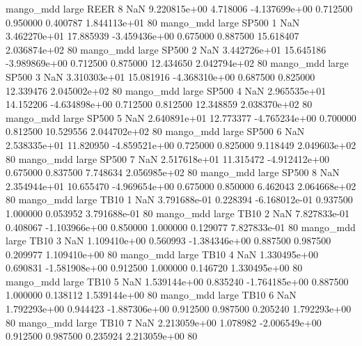         mango_mdd      large     REER                 8                  NaN 9.220815e+00      4.718006 -4.137699e+00 0.712500 0.950000       0.400787 1.844113e+01 80
        mango_mdd      large    SP500                 1                  NaN 3.462270e+01     17.885939 -3.459436e+00 0.675000 0.887500      15.618407 2.036874e+02 80
        mango_mdd      large    SP500                 2                  NaN 3.442726e+01     15.645186 -3.989869e+00 0.712500 0.875000      12.434650 2.042794e+02 80
        mango_mdd      large    SP500                 3                  NaN 3.310303e+01     15.081916 -4.368310e+00 0.687500 0.825000      12.339476 2.045002e+02 80
        mango_mdd      large    SP500                 4                  NaN 2.965535e+01     14.152206 -4.634898e+00 0.712500 0.812500      12.348859 2.038370e+02 80
        mango_mdd      large    SP500                 5                  NaN 2.640891e+01     12.773377 -4.765234e+00 0.700000 0.812500      10.529556 2.044702e+02 80
        mango_mdd      large    SP500                 6                  NaN 2.538335e+01     11.820950 -4.859521e+00 0.725000 0.825000       9.118449 2.049603e+02 80
        mango_mdd      large    SP500                 7                  NaN 2.517618e+01     11.315472 -4.912412e+00 0.675000 0.837500       7.748634 2.056985e+02 80
        mango_mdd      large    SP500                 8                  NaN 2.354944e+01     10.655470 -4.969654e+00 0.675000 0.850000       6.462043 2.064668e+02 80
        mango_mdd      large     TB10                 1                  NaN 3.791688e-01      0.228394 -6.168012e-01 0.937500 1.000000       0.053952 3.791688e-01 80
        mango_mdd      large     TB10                 2                  NaN 7.827833e-01      0.408067 -1.103966e+00 0.850000 1.000000       0.129077 7.827833e-01 80
        mango_mdd      large     TB10                 3                  NaN 1.109410e+00      0.560993 -1.384346e+00 0.887500 0.987500       0.209977 1.109410e+00 80
        mango_mdd      large     TB10                 4                  NaN 1.330495e+00      0.690831 -1.581908e+00 0.912500 1.000000       0.146720 1.330495e+00 80
        mango_mdd      large     TB10                 5                  NaN 1.539144e+00      0.835240 -1.764185e+00 0.887500 1.000000       0.138112 1.539144e+00 80
        mango_mdd      large     TB10                 6                  NaN 1.792293e+00      0.944423 -1.887306e+00 0.912500 0.987500       0.205240 1.792293e+00 80
        mango_mdd      large     TB10                 7                  NaN 2.213059e+00      1.078982 -2.006549e+00 0.912500 0.987500       0.235924 2.213059e+00 80
